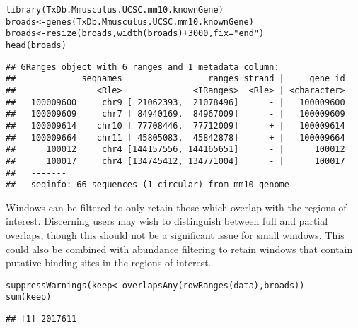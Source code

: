 \documentclass{report}\usepackage[]{graphicx}\usepackage[usenames,dvipsnames]{color}
\newcommand{\hlnum}[1]{\textcolor[rgb]{0.816,0.125,0.439}{#1}}%
\newcommand{\hlstr}[1]{\textcolor[rgb]{0.251,0.627,0.251}{#1}}%
\newcommand{\hlopt}[1]{\textcolor[rgb]{0,0,0}{#1}}%
\newcommand{\hlstd}[1]{\textcolor[rgb]{0.251,0.251,0.251}{#1}}%
\newcommand{\hlkwb}[1]{\textcolor[rgb]{0,0,0}{#1}}%
\newcommand{\hlkwc}[1]{\textcolor[rgb]{0.251,0.251,0.251}{#1}}%
\newcommand{\hlkwd}[1]{\textcolor[rgb]{0.878,0.439,0.125}{#1}}%
\newenvironment{knitrout}{}{} %
\begin{document}
\begin{knitrout}
\color{fgcolor}\begin{kframe}
\begin{alltt}
\hlkwd{library}\hlstd{(TxDb.Mmusculus.UCSC.mm10.knownGene)}
\hlstd{broads} \hlkwb{<-} \hlkwd{genes}\hlstd{(TxDb.Mmusculus.UCSC.mm10.knownGene)}
\hlstd{broads} \hlkwb{<-} \hlkwd{resize}\hlstd{(broads,} \hlkwd{width}\hlstd{(broads)}\hlopt{+}\hlnum{3000}\hlstd{,} \hlkwc{fix}\hlstd{=}\hlstr{"end"}\hlstd{)}
\hlkwd{head}\hlstd{(broads)}
\end{alltt}
\begin{verbatim}
## GRanges object with 6 ranges and 1 metadata column:
##             seqnames                 ranges strand |     gene_id
##                <Rle>              <IRanges>  <Rle> | <character>
##   100009600     chr9 [ 21062393,  21078496]      - |   100009600
##   100009609     chr7 [ 84940169,  84967009]      - |   100009609
##   100009614    chr10 [ 77708446,  77712009]      + |   100009614
##   100009664    chr11 [ 45805083,  45842878]      + |   100009664
##      100012     chr4 [144157556, 144165651]      - |      100012
##      100017     chr4 [134745412, 134771004]      - |      100017
##   -------
##   seqinfo: 66 sequences (1 circular) from mm10 genome
\end{verbatim}
\end{kframe}
\end{knitrout}
 
Windows can be filtered to only retain those which overlap with the regions of interest. 
Discerning users may wish to distinguish between full and partial overlaps, though this should not be a significant issue for small windows.
This could also be combined with abundance filtering to retain windows that contain putative binding sites in the regions of interest.

\begin{knitrout}
\color{fgcolor}\begin{kframe}
\begin{alltt}
\hlkwd{suppressWarnings}\hlstd{(keep} \hlkwb{<-} \hlkwd{overlapsAny}\hlstd{(}\hlkwd{rowRanges}\hlstd{(data), broads))}
\hlkwd{sum}\hlstd{(keep)}
\end{alltt}
\begin{verbatim}
## [1] 2017611
\end{verbatim}
\end{kframe}
\end{knitrout}
\end{document}
